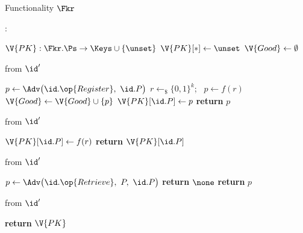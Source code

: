 \begin{interface}[nofloat]{Functionality $\Fkr$ \\
}

{\scriptsize
\setlength{\columnsep}{1.4em}
\begin{multicols}{2}
:
\begin{algorithmic}[1]
\setcounter{contline}{0}\algcont
\State $\V{PK} : \Fkr.\Ps \to \Keys \cup \{\unset\}$
\State $\V{PK}[*] \gets \unset$
\State $\V{Good} \gets \emptyset$
\algsave
\end{algorithmic}
\vspace{1.4ex}

 \quad from $\id'$
\begin{algorithmic}[1]
\algcont
{}
\State $p \gets \Adv\bigl(\id.\op{Register},\ \id.P\bigr)$
 \label{ln:krkonlygood}
  \State $r \gets_{\$} \{0,1\}^{k}$; \ $p \gets f(r)$ \label{ln:krkdraw}
  \State $\V{Good} \gets \V{Good} \cup \{p\}$
\EndIf
\State $\V{PK}[\id.P] \gets p$
\State \textbf{return} $p$
\algsave
\end{algorithmic}
\vspace{1.4ex}

 \quad from $\id'$
\begin{algorithmic}[1]
\algcont
{} \label{ln:krkcorruptonly}
\State $\V{PK}[\id.P] \gets f(r)$ \label{ln:krkwellformed}
\State \textbf{return} $\V{PK}[\id.P]$
\algsave
\end{algorithmic}
\vspace{1.4ex}

\columnbreak

 \quad from $\id'$
\begin{algorithmic}[1]
\algcont
\State $p \gets \Adv\bigl(\id.\op{Retrieve},\ P,\ \id.P\bigr)$
 \label{ln:krkwithhold}
  \State \textbf{return} $\none$
\EndIf
\State \textbf{return} $p$
\algsave
\end{algorithmic}
\vspace{1.4ex}

 \quad from $\id'$
\begin{algorithmic}[1]
\algcont
\State \textbf{return} $\V{PK}$ \label{ln:krkleak}
\algsave
\end{algorithmic}
\end{multicols}}
\end{interface}
